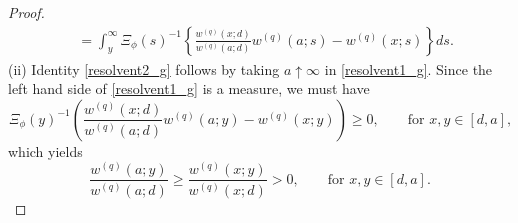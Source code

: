 \documentclass[12pt,reqno]{amsart}
\newcommand{\red}{\textcolor[rgb]{1.00,0.00,0.00}}
\theoremstyle{definition}
\theoremstyle{remark}
\newcommand{\e}{\mathbb{E}}
\newcommand{\ind}{\mathbf{1}}
\begin{document}
\begin{proof}
\begin{align*}
&=\int_{y}^{\infty}\Xi_{\phi}(s)^{-1} \left\{\frac{w^{(q)}(x;d)}{w^{(q)}(a;d)}w^{(q)}(a;s)-w^{(q)}(x;s)\right\} ds.
\end{align*}
(ii) %
 Identity \eqref{resolvent2_g} follows by taking $a\uparrow\infty$ in \eqref{resolvent1_g}. %
Since the left hand side of \eqref{resolvent1_g} is a measure, we must have
\[
\Xi_{\phi}(y)^{-1} \left(\frac{w^{(q)}(x;d)}{w^{(q)}(a;d)}w^{(q)}(a;y)-w^{(q)}(x;y)\right)\ge0,\qquad\text{for $x,y\in[d,a]$,}
\]
which yields 
$$\frac{w^{(q)}(a;y)}{w^{(q)}(a;d)}\ge \frac{w^{(q)}(x;y)}{w^{(q)}(x;d)}>0,\qquad\text{for $x,y\in[d,a]$.}$$

\end{proof}
\end{document}
